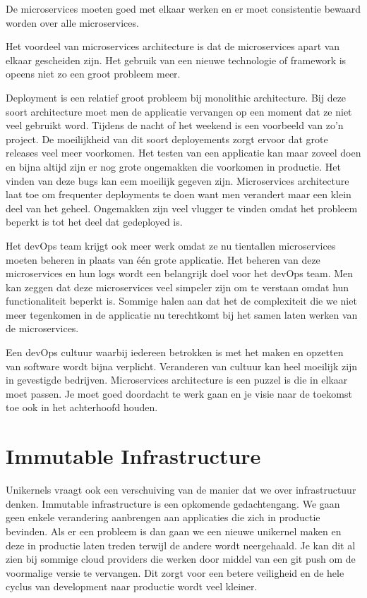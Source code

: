 \documentclass[pdftex,a4paper,12pt,twoside]{report}
\begin{document}
De microservices moeten goed met elkaar werken en er moet consistentie bewaard worden over alle microservices. 

Het voordeel van microservices architecture is dat de microservices apart van elkaar gescheiden zijn. Het gebruik van een nieuwe technologie of framework is opeens niet zo een groot probleem meer.

Deployment is een relatief groot probleem bij monolithic architecture. Bij deze soort architecture moet men de applicatie vervangen op een moment dat ze niet veel gebruikt word. Tijdens de nacht of het weekend is een voorbeeld van zo'n project. De moeilijkheid van dit soort deployements zorgt ervoor dat grote releases veel meer voorkomen. Het testen van een applicatie kan maar zoveel doen en bijna altijd zijn er nog grote ongemakken die voorkomen in productie. Het vinden van deze bugs kan eem moeilijk gegeven zijn. Microservices architecture laat toe om frequenter deployments te doen want men verandert maar een klein deel van het geheel. Ongemakken zijn veel vlugger te vinden omdat het probleem beperkt is tot het deel dat gedeployed is.

Het devOps team krijgt ook meer werk omdat ze nu tientallen microservices moeten beheren in plaats van één grote applicatie. Het beheren van deze microservices en hun logs wordt een belangrijk doel voor het devOps team. Men kan zeggen dat deze microservices veel simpeler zijn om te verstaan omdat hun functionaliteit beperkt is. Sommige halen aan dat het de complexiteit die we niet meer tegenkomen in de applicatie nu terechtkomt bij het samen laten werken van de microservices. 

Een devOps cultuur waarbij iedereen betrokken is met het maken en opzetten van software wordt bijna verplicht. Veranderen van cultuur kan heel moeilijk zijn in gevestigde bedrijven. Microservices architecture is een puzzel is die in elkaar moet passen. Je moet goed doordacht te werk gaan en je visie naar de toekomst toe ook in het achterhoofd houden.

\section{Immutable Infrastructure}

Unikernels vraagt ook een verschuiving van de manier dat we over infrastructuur denken. Immutable infrastructure is een opkomende gedachtengang. We gaan geen enkele verandering aanbrengen aan applicaties die zich in productie bevinden. Als er een probleem is dan gaan we een nieuwe unikernel maken en deze in productie laten treden terwijl de andere wordt neergehaald. Je kan dit al zien bij sommige cloud providers die werken door middel van een git push om de voormalige versie te vervangen. Dit zorgt voor een betere veiligheid en de hele cyclus van development naar productie wordt veel kleiner.
\end{document}
